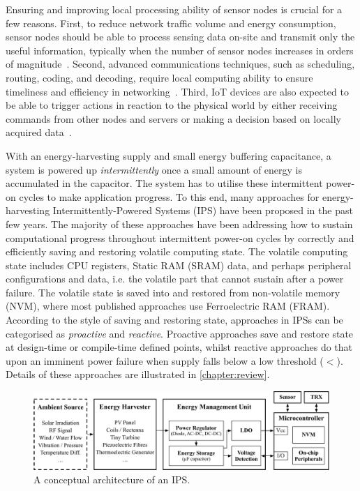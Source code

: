 Ensuring and improving local processing ability of sensor nodes is crucial for a few reasons. First, to reduce network traffic volume and energy consumption, sensor nodes should be able to process sensing data on-site and transmit only the useful information, typically when the number of sensor nodes increases in orders of magnitude~\cite{shi2016edge}. Second, advanced communications techniques, such as scheduling, routing, coding, and decoding, require local computing ability to ensure timeliness and efficiency in networking~\cite{akyildiz2002wireless}. Third, IoT devices are also expected to be able to trigger actions in reaction to the physical world by either receiving commands from other nodes and servers or making a decision based on locally acquired data~\cite{miorandi2012internet}. 


With an energy-harvesting supply and small energy buffering capacitance, a system is powered up \textit{intermittently} once a small amount of energy is accumulated in the capacitor. 
The system has to utilise these intermittent power-on cycles to make application progress. 
To this end, many approaches for energy-harvesting Intermittently-Powered Systems (IPS) have been proposed in the past few years. 
The majority of these approaches have been addressing how to sustain computational progress throughout intermittent power-on cycles by correctly and efficiently saving and restoring volatile computing state. 
The volatile computing state includes CPU registers, Static RAM (SRAM) data, and perhaps peripheral configurations and data, i.e. the volatile part that cannot sustain after a power failure. 
The volatile state is saved into and restored from non-volatile memory (NVM), where most published approaches use Ferroelectric RAM (FRAM). 
According to the style of saving and restoring state, approaches in IPSs can be categorised as \textit{proactive} and \textit{reactive}. 
Proactive approaches save and restore state at design-time or compile-time defined points, whilst reactive approaches do that upon an imminent power failure when supply falls below a low threshold ($<$). 
Details of these approaches are illustrated in \cref{chapter:review}.

\begin{figure}[!htb]
  \centering
  \includegraphics[width=\columnwidth]{ch1_intro/figures/IPSarch}
  \caption{A conceptual architecture of an IPS.}
  \label{fig:ips_arch}
\end{figure}

